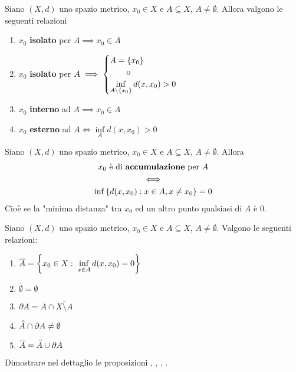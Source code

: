 \begin{proposition}
	\label{prop:relaz_sp_metr_1}
	Siano $(X,d)$ uno spazio metrico, $x_0 \in X$ e $A \subseteq X$, $A \neq \emptyset$. Allora valgono le seguenti relazioni
	\begin{enumerate}
		\item $x_0$ \textbf{isolato} per $A \implies x_0 \in A$
		\item $x_0$ \textbf{isolato} per $A \implies \begin{cases} A = \left\{x_0\right\}\\\qquad \text{o}\\\inf\limits_{A \setminus \left\{x_0\right\}} d(x,x_0) > 0\end{cases}$
		\item $x_0$ \textbf{interno} ad $A \implies x_0 \in A$
		\item $x_0$ \textbf{esterno} ad $A \iff \inf\limits_A d(x,x_0) > 0$
		\end{enumerate}
\end{proposition}
\begin{proposition}
	\label{prop:condiz_punt_accumulaz}
	Siano $(X,d)$ uno spazio metrico, $x_0 \in X$ e $A \subseteq X$, $A \neq \emptyset$. Allora
	\begin{equation*}
		\begin{gathered}
			x_0 \text{ è di \textbf{accumulazione} per } A\\
			\iff\\
			\inf \left\{d(x,x_0) : x \in A, x \neq x_0\right\} = 0
		\end{gathered}
	\end{equation*}
	Cioè se la "minima distanza" tra $x_0$ ed un altro punto qualsiasi di $A$ è $0$.
\end{proposition}
\begin{proposition}
	\label{prop:relaz_sp_metr_2}
	Siano $(X,d)$ uno spazio metrico, $x_0 \in X$ e $A \subseteq X$, $A \neq \emptyset$. Valgono le seguenti relazioni:
	\begin{enumerate}
		\item $\overline{A} = \left\{x_0 \in X:\; \inf\limits_{x \in A} d(x, x_0) = 0\right\}$
		\item $\overline{\emptyset} = \emptyset$
		\item $\partial A = \overline{A} \cap \overline{X \setminus A}$
		\item $\accentset{\circ}{A} \cap \partial A \neq \emptyset$
		\item $\overline{A} = \accentset{\circ}{A} \cup \partial A$
	\end{enumerate}
\end{proposition}
\begin{exercise}
	Dimostrare nel dettaglio le proposizioni , , , .
\end{exercise}

